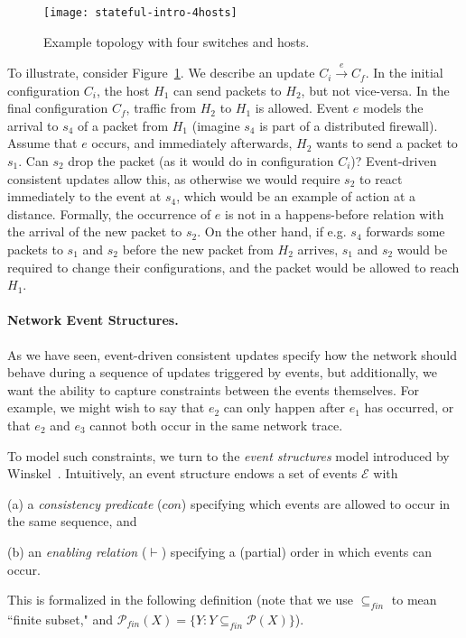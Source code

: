\documentclass[pldi-cameraready]{sigplanconf}
\newcommand{\fin}{\ensuremath{\mathit{fin}}}
\begin{document}
\begin{figure}[t]
\centering
\texttt{[image: stateful-intro-4hosts]}
\caption{Example topology with four switches and hosts.}
\label{fig:statefulIntro4nodes}
\end{figure}

To illustrate, consider Figure~\ref{fig:statefulIntro4nodes}. We
describe an update $C_i \xrightarrow{e} C_f$. In the initial
configuration $C_i$, the host $H_1$ can send packets to $H_2$, but not
vice-versa. In the final configuration $C_f$, traffic from $H_2$ to
$H_1$ is allowed. Event $e$ models the arrival to $s_4$ of a packet
from $H_1$ (imagine $s_4$ is part of a distributed firewall). Assume
that $e$ occurs, and immediately afterwards, $H_2$ wants to send a
packet to $s_1$. Can $s_2$ drop the packet (as it would do in
configuration $C_i$)? Event-driven consistent updates allow this, as
otherwise we would require $s_2$ to react immediately to the event at
$s_4$, which would be an example of action at a distance. Formally,
the occurrence of $e$ is not in a happens-before relation with the
arrival of the new packet to $s_2$. On the other hand, if e.g. $s_4$
forwards some packets to $s_1$ and $s_2$ before the new packet from
$H_2$ arrives, $s_1$ and $s_2$ would be required to change their
configurations, and the packet would be allowed to reach $H_1$.



\paragraph*{Network Event Structures.}
As we have seen, event-driven consistent updates specify how the network should behave
during a sequence of updates triggered by events, but additionally, we want the ability to
capture constraints
between the events themselves. For example, we might wish to say that $e_2$ can
only happen after $e_1$ has occurred, or that $e_2$ and $e_3$ cannot
both occur in the same network trace.




To model such constraints, we turn to the {\em event structures} model
introduced by Winskel~\cite{winskel1987event}.
Intuitively, an event structure endows a set of events $\mathcal{E}$
with
\begin{inparaenum}
\item[(a)] a {\em consistency predicate} ($con$) specifying which events
  are allowed to occur in the same sequence, and 
\item[(b)] an {\em enabling relation} ($\vdash$) specifying a (partial)
  order in which events can occur. 
\end{inparaenum}
This is formalized in the following definition (note that we use $\subseteq_{\fin}$ to
mean ``finite subset," and $\mathcal{P}_{\fin}(X) = \{Y : Y \subseteq_{\fin} \mathcal{P}(X)\}$).
\end{document}
